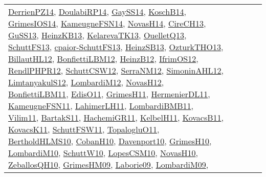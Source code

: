 {\begin{longtable}{llp{6cm}p{6cm}p{6cm}}
\href{papers/DerrienPZ14.pdf}{DerrienPZ14}\cite{DerrienPZ14}, \href{papers/DoulabiRP14.pdf}{DoulabiRP14}\cite{DoulabiRP14}, \href{papers/GaySS14.pdf}{GaySS14}\cite{GaySS14}, \href{papers/KoschB14.pdf}{KoschB14}\cite{KoschB14}, \href{articles/GrimesIOS14.pdf}{GrimesIOS14}\cite{GrimesIOS14}, \href{articles/KameugneFSN14.pdf}{KameugneFSN14}\cite{KameugneFSN14}, \href{articles/NovasH14.pdf}{NovasH14}\cite{NovasH14}, \href{papers/CireCH13.pdf}{CireCH13}\cite{CireCH13}, \href{papers/GuSS13.pdf}{GuSS13}\cite{GuSS13}, \href{papers/HeinzKB13.pdf}{HeinzKB13}\cite{HeinzKB13}, \href{papers/KelarevaTK13.pdf}{KelarevaTK13}\cite{KelarevaTK13}, \href{papers/OuelletQ13.pdf}{OuelletQ13}\cite{OuelletQ13}, \href{papers/SchuttFS13.pdf}{SchuttFS13}\cite{SchuttFS13}, \href{papers/cpaior-SchuttFS13.pdf}{cpaior-SchuttFS13}\cite{cpaior-SchuttFS13}, \href{articles/HeinzSB13.pdf}{HeinzSB13}\cite{HeinzSB13}, \href{articles/OzturkTHO13.pdf}{OzturkTHO13}\cite{OzturkTHO13}, \href{papers/BillautHL12.pdf}{BillautHL12}\cite{BillautHL12}, \href{papers/BonfiettiLBM12.pdf}{BonfiettiLBM12}\cite{BonfiettiLBM12}, \href{papers/HeinzB12.pdf}{HeinzB12}\cite{HeinzB12}, \href{papers/IfrimOS12.pdf}{IfrimOS12}\cite{IfrimOS12}, \href{papers/RendlPHPR12.pdf}{RendlPHPR12}\cite{RendlPHPR12}, \href{papers/SchuttCSW12.pdf}{SchuttCSW12}\cite{SchuttCSW12}, \href{papers/SerraNM12.pdf}{SerraNM12}\cite{SerraNM12}, \href{papers/SimoninAHL12.pdf}{SimoninAHL12}\cite{SimoninAHL12}, \href{articles/LimtanyakulS12.pdf}{LimtanyakulS12}\cite{LimtanyakulS12}, \href{articles/LombardiM12.pdf}{LombardiM12}\cite{LombardiM12}, \href{articles/NovasH12.pdf}{NovasH12}\cite{NovasH12}, \href{papers/BonfiettiLBM11.pdf}{BonfiettiLBM11}\cite{BonfiettiLBM11}, \href{papers/EdisO11.pdf}{EdisO11}\cite{EdisO11}, \href{papers/GrimesH11.pdf}{GrimesH11}\cite{GrimesH11}, \href{papers/HermenierDL11.pdf}{HermenierDL11}\cite{HermenierDL11}, \href{papers/KameugneFSN11.pdf}{KameugneFSN11}\cite{KameugneFSN11}, \href{papers/LahimerLH11.pdf}{LahimerLH11}\cite{LahimerLH11}, \href{papers/LombardiBMB11.pdf}{LombardiBMB11}\cite{LombardiBMB11}, \href{papers/Vilim11.pdf}{Vilim11}\cite{Vilim11}, \href{articles/BartakS11.pdf}{BartakS11}\cite{BartakS11}, \href{articles/HachemiGR11.pdf}{HachemiGR11}\cite{HachemiGR11}, \href{articles/KelbelH11.pdf}{KelbelH11}\cite{KelbelH11}, \href{articles/KovacsB11.pdf}{KovacsB11}\cite{KovacsB11}, \href{articles/KovacsK11.pdf}{KovacsK11}\cite{KovacsK11}, \href{articles/SchuttFSW11.pdf}{SchuttFSW11}\cite{SchuttFSW11}, \href{articles/TopalogluO11.pdf}{TopalogluO11}\cite{TopalogluO11}, \href{papers/BertholdHLMS10.pdf}{BertholdHLMS10}\cite{BertholdHLMS10}, \href{papers/CobanH10.pdf}{CobanH10}\cite{CobanH10}, \href{papers/Davenport10.pdf}{Davenport10}\cite{Davenport10}, \href{papers/GrimesH10.pdf}{GrimesH10}\cite{GrimesH10}, \href{papers/LombardiM10.pdf}{LombardiM10}\cite{LombardiM10}, \href{papers/SchuttW10.pdf}{SchuttW10}\cite{SchuttW10}, \href{articles/LopesCSM10.pdf}{LopesCSM10}\cite{LopesCSM10}, \href{articles/NovasH10.pdf}{NovasH10}\cite{NovasH10}, \href{articles/ZeballosQH10.pdf}{ZeballosQH10}\cite{ZeballosQH10}, \href{papers/GrimesHM09.pdf}{GrimesHM09}\cite{GrimesHM09}, \href{papers/Laborie09.pdf}{Laborie09}\cite{Laborie09}, \href{papers/LombardiM09.pdf}{LombardiM09}\cite{LombardiM09}, 
\end{longtable}}
